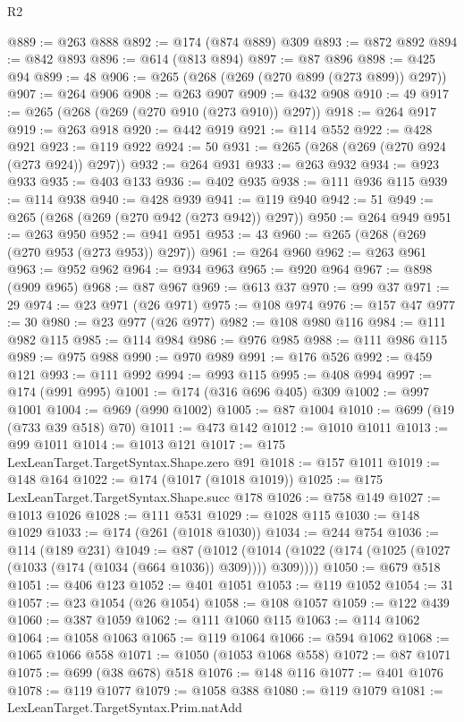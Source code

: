 \begin{lexlean}{R2}
\begin{coremodule}
@889 := @263 @888
@892 := @174 (@874 @889) @309
@893 := @872 @892
@894 := @842 @893
@896 := @614 (@813 @894)
@897 := @87 @896
@898 := @425 @94
@899 := 48
@906 := @265 (@268 (@269 (@270 @899 (@273 @899)) @297))
@907 := @264 @906
@908 := @263 @907
@909 := @432 @908
@910 := 49
@917 := @265 (@268 (@269 (@270 @910 (@273 @910)) @297))
@918 := @264 @917
@919 := @263 @918
@920 := @442 @919
@921 := @114 @552
@922 := @428 @921
@923 := @119 @922
@924 := 50
@931 := @265 (@268 (@269 (@270 @924 (@273 @924)) @297))
@932 := @264 @931
@933 := @263 @932
@934 := @923 @933
@935 := @403 @133
@936 := @402 @935
@938 := @111 @936 @115
@939 := @114 @938
@940 := @428 @939
@941 := @119 @940
@942 := 51
@949 := @265 (@268 (@269 (@270 @942 (@273 @942)) @297))
@950 := @264 @949
@951 := @263 @950
@952 := @941 @951
@953 := 43
@960 := @265 (@268 (@269 (@270 @953 (@273 @953)) @297))
@961 := @264 @960
@962 := @263 @961
@963 := @952 @962
@964 := @934 @963
@965 := @920 @964
@967 := @898 (@909 @965)
@968 := @87 @967
@969 := @613 @37
@970 := @99 @37
@971 := 29
@974 := @23 @971 (@26 @971)
@975 := @108 @974
@976 := @157 @47
@977 := 30
@980 := @23 @977 (@26 @977)
@982 := @108 @980 @116
@984 := @111 @982 @115
@985 := @114 @984
@986 := @976 @985
@988 := @111 @986 @115
@989 := @975 @988
@990 := @970 @989
@991 := @176 @526
@992 := @459 @121
@993 := @111 @992
@994 := @993 @115
@995 := @408 @994
@997 := @174 (@991 @995)
@1001 := @174 (@316 @696 @405) @309
@1002 := @997 @1001
@1004 := @969 (@990 @1002)
@1005 := @87 @1004
@1010 := @699 (@19 (@733 @39 @518) @70)
@1011 := @473 @142
@1012 := @1010 @1011
@1013 := @99 @1011
@1014 := @1013 @121
@1017 := @175 LexLeanTarget.TargetSyntax.Shape.zero @91
@1018 := @157 @1011
@1019 := @148 @164
@1022 := @174 (@1017 (@1018 @1019))
@1025 := @175 LexLeanTarget.TargetSyntax.Shape.succ @178
@1026 := @758 @149
@1027 := @1013 @1026
@1028 := @111 @531
@1029 := @1028 @115
@1030 := @148 @1029
@1033 := @174 (@261 (@1018 @1030))
@1034 := @244 @754
@1036 := @114 (@189 @231)
@1049 := @87
    (@1012 (@1014 (@1022 (@174 (@1025 (@1027 (@1033 (@174 (@1034 (@664 @1036)) @309)))) @309))))
@1050 := @679 @518
@1051 := @406 @123
@1052 := @401 @1051
@1053 := @119 @1052
@1054 := 31
@1057 := @23 @1054 (@26 @1054)
@1058 := @108 @1057
@1059 := @122 @439
@1060 := @387 @1059
@1062 := @111 @1060 @115
@1063 := @114 @1062
@1064 := @1058 @1063
@1065 := @119 @1064
@1066 := @594 @1062
@1068 := @1065 @1066 @558
@1071 := @1050 (@1053 @1068 @558)
@1072 := @87 @1071
@1075 := @699 (@38 @678) @518
@1076 := @148 @116
@1077 := @401 @1076
@1078 := @119 @1077
@1079 := @1058 @388
@1080 := @119 @1079
@1081 := LexLeanTarget.TargetSyntax.Prim.natAdd

\end{coremodule}
\end{lexlean}
